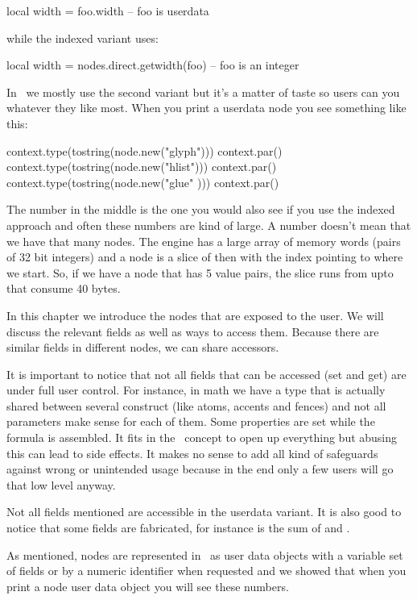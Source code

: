 \starttyping [option=LUA]
local width = foo.width -- foo is userdata
\stoptyping

while the indexed variant uses:

\starttyping [option=LUA]
local width = nodes.direct.getwidth(foo) -- foo is an integer
\stoptyping

In \CONTEXT\ we mostly use the second variant but it's a matter of taste so users
can you whatever they like most. When you print a userdata node you see something
like this:

\startlines
\startluacode
context.type(tostring(node.new("glyph"))) context.par()
context.type(tostring(node.new("hlist"))) context.par()
context.type(tostring(node.new("glue" ))) context.par()
\stopluacode
\stoplines

The number in the middle is the one you would also see if you use the indexed
approach and often these numbers are kind of large. A number 
doesn't mean that we have that many nodes. The engine has a large array of memory
words (pairs of 32 bit integers) and a node is a slice of then with the index
pointing to where we start. So, if we have a node that has 5 value pairs, the
slice runs from  upto  that consume 40 bytes.

In this chapter we introduce the nodes that are exposed to the user. We will
discuss the relevant fields as well as ways to access them. Because there are
similar fields in different nodes, we can share accessors.

It is important to notice that not all fields that can be accessed (set and get)
are under full user control. For instance, in math we have a  type
that is actually shared between several construct (like atoms, accents and
fences) and not all parameters make sense for each of them. Some properties are
set while the formula is assembled. It fits in the \LUAMETATEX\ concept to open
up everything but abusing this can lead to side effects. It makes no sense to add
all kind of safeguards against wrong or unintended usage because in the end only
a few users will go that low level anyway.

Not all fields mentioned are accessible in the userdata variant. It is also good
to notice that some fields are fabricated, for instance  is the sum
of  and .

\stopsection

\startsection[title={\LUA\ node representation}]

As mentioned, nodes are represented in \LUA\ as user data objects with a variable
set of fields or by a numeric identifier when requested and we showed that when
you print a node user data object you will see these numbers.

